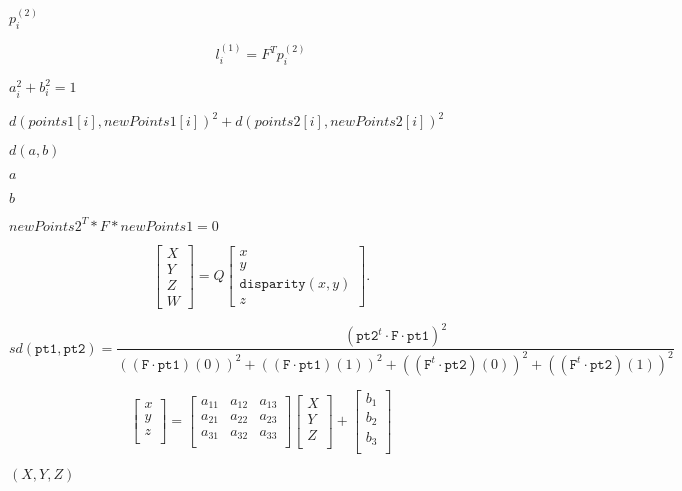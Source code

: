 \documentclass{article}
\begin{document}
$p^{(2)}_i$
\pagebreak

\[l^{(1)}_i = F^T p^{(2)}_i\]
\pagebreak

$a_i^2+b_i^2=1$
\pagebreak

$d(points1[i], newPoints1[i])^2 + d(points2[i],newPoints2[i])^2$
\pagebreak

$d(a,b)$
\pagebreak

$a$
\pagebreak

$b$
\pagebreak

$newPoints2^T * F * newPoints1 = 0$
\pagebreak

\[\begin{bmatrix} X \\ Y \\ Z \\ W \end{bmatrix} = Q \begin{bmatrix} x \\ y \\ \texttt{disparity} (x,y) \\ z \end{bmatrix}.\]
\pagebreak

\[ sd( \texttt{pt1} , \texttt{pt2} )= \frac{(\texttt{pt2}^t \cdot \texttt{F} \cdot \texttt{pt1})^2} {((\texttt{F} \cdot \texttt{pt1})(0))^2 + ((\texttt{F} \cdot \texttt{pt1})(1))^2 + ((\texttt{F}^t \cdot \texttt{pt2})(0))^2 + ((\texttt{F}^t \cdot \texttt{pt2})(1))^2} \]
\pagebreak

\[ \begin{bmatrix} x\\ y\\ z\\ \end{bmatrix} = \begin{bmatrix} a_{11} & a_{12} & a_{13}\\ a_{21} & a_{22} & a_{23}\\ a_{31} & a_{32} & a_{33}\\ \end{bmatrix} \begin{bmatrix} X\\ Y\\ Z\\ \end{bmatrix} + \begin{bmatrix} b_1\\ b_2\\ b_3\\ \end{bmatrix} \]
\pagebreak

$(X,Y,Z)$
\pagebreak
\end{document}
